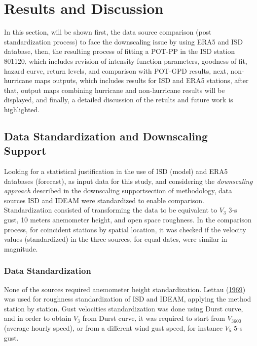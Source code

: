 \documentclass[12pt,oneside]{reedthesis}
\begin{document}
\hypertarget{rmd-results}{%
\chapter{Results and Discussion}\label{rmd-results}}

In this section, will be shown first, the data source comparison (post standardization process) to face the downscaling issue by using ERA5 and ISD database, then, the resulting process of fitting a POT-PP in the ISD station 801120, which includes revision of intensity function parameters, goodness of fit, hazard curve, return levels, and comparison with POT-GPD results, next, non-hurricane maps outputs, which includes results for ISD and ERA5 stations, after that, output maps combining hurricane and non-hurricane results will be displayed, and finally, a detailed discussion of the retults and future work is highlighted.

\hypertarget{data-standardization-and-downscaling-support}{%
\section{Data Standardization and Downscaling Support}\label{data-standardization-and-downscaling-support}}

Looking for a statistical justification in the use of ISD (model) and ERA5 databases (forecast), as input data for this study, and considering the \emph{downscaling approach} described in the \protect\hyperlink{ds}{downscaling support}section of methodology, data sources ISD and IDEAM were standardized to enable comparison. Standardization consisted of transforming the data to be equivalent to \(V_3\) 3-s gust, 10 meters anemometer height, and open space roughness. In the comparison process, for coincident stations by spatial location, it was checked if the velocity values (standardized) in the three sources, for equal dates, were similar in magnitude.

\hypertarget{data-standardization}{%
\subsection{Data Standardization}\label{data-standardization}}

None of the sources required anemometer height standardization. Lettau (\protect\hyperlink{ref-Lettau1969}{1969}) was used for roughness standardization of ISD and IDEAM, applying the method station by station. Gust velocities standardization was done using Durst curve, and in order to obtain \(V_3\) from Durst curve, it was required to start from \(V_{3600}\) (average hourly speed), or from a different wind gust speed, for instance \(V_5\) 5-s gust.
\end{document}
